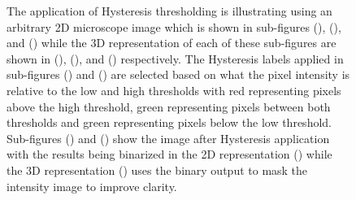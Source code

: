 \begin{figure}
    \caption[\textcolor{red}{This is currently not complete as 3D images are being a bit difficult and this is going to be moved to Chapter 2 (Hysteresis Section)}Showcasing the application of Hysteresis thresholding on a microscope image along with 3D intensity projections]{The application of Hysteresis thresholding is illustrating using an arbitrary 2D microscope image which is shown in sub-figures (), (), and () while the 3D representation of each of these sub-figures are shown in (), (), and () respectively. The Hysteresis labels applied in sub-figures () and () are selected based on what the pixel intensity is relative to the low and high thresholds with red representing pixels above the high threshold, green representing pixels between both thresholds and green representing pixels below the low threshold. Sub-figures () and () show the image after Hysteresis application with the results being binarized in the 2D representation () while the 3D representation () uses the binary output to mask the intensity image to improve clarity.}
    \label{fig:hysteresis_showcase_2D_3D}
\end{figure}
